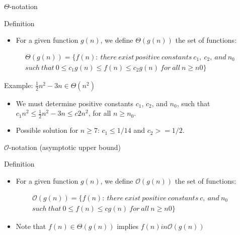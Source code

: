 \begin{frame}{$\Theta$-notation}

  \begin{block}{Definition}
    \begin{itemize}
    \item For a given function $g(n)$, we define
      $\Theta(g(n))$ the set of functions:
    \end{itemize}
    
    \begin{small}
      \begin{multline*}
        \Theta(g(n)) = \{ f(n):\ there\ exist\ positive\ constants\ c_1,\ c_2,\ and\ n_0\ \\ such\ that\ 
                       0 \leq c_1g(n) \leq f(n) \leq c_2g(n)\ for\ all\ n \geq n0\}
      \end{multline*}
    \end{small}
  \end{block}

\end{frame}

\begin{frame}
  Example: $\frac{1}{2}n^2 - 3n \in \Theta(n^2)$ \pause

  \begin{itemize}
  \item We must determine positive constants $c_1$, $c_2$, and $n_0$,
    such that $c_1n^2 \leq \frac{1}{2}n^2 -3n \leq c2n^2$, for all $n \geq n_0$. \pause
  \item Possible solution for $n \geq 7$: \pause $c_1 \leq 1/14$ and $c_2 >= 1/2$.   
  \end{itemize} 
\end{frame}


\begin{frame}{$\mathcal{O}$-notation (asymptotic upper bound)}

  \begin{block}{Definition}
    \begin{itemize}
    \item For a given function $g(n)$, we define
      $\mathcal{O}(g(n))$ the set of functions:
    \end{itemize}
    
    \begin{small}
      \begin{multline*}
        \mathcal{O}(g(n)) = \{ f(n):\ there\ exist\ positive\ constants\ c,\ and\ n_0\ \\ such\ that\ 
                       0 \leq f(n) \leq cg(n)\ for\ all\ n \geq n0\}
      \end{multline*}
    \end{small}

    \begin{itemize}
      \item Note that $f(n) \in \Theta(g(n))$ implies $f(n) in \mathcal{O}(g(n))$  
    \end{itemize}
  \end{block}

\end{frame}

